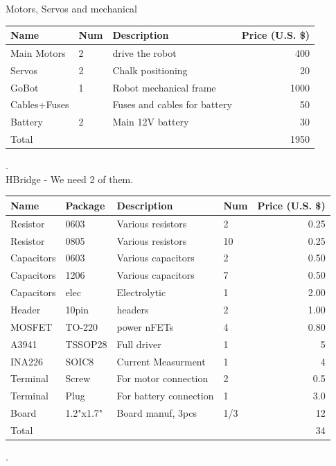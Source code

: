 \documentclass[12pt]{article}
\begin{document}
Motors, Servos and mechanical\\
\begin{tabular}{| l || l | l |r | }
  \hline                       
    Name &Num &Description & Price (U.S. \$) \\ \hline
     Main Motors&2 & drive the robot  & 400 \\
     Servos&2&Chalk positioning & 20 \\
     GoBot&1&Robot mechanical frame& 1000\\ 
     Cables+Fuses&&Fuses and cables for battery&50 \\
     Battery&2&Main 12V battery& 30\\ \hline
     Total  &&&1950\\
   \hline  
   \end{tabular}.\\
  
  HBridge - We need 2 of them.\\
\begin{tabular}{| l | l||l|l | r | }
  \hline                       
    Name & Package & Description & Num &Price (U.S. \$) \\ \hline
    Resistor& 0603&Various resistors&2&0.25 \\
    Resistor& 0805&Various resistors&10&0.25\\
    Capacitors&0603&Various capacitors&2&0.50\\
    Capacitors&1206&Various capacitors&7&0.50\\
    Capacitors&elec&Electrolytic&1&2.00\\
    Header&10pin&headers&2&1.00\\
    MOSFET&TO-220&power nFETs&4&0.80\\
    A3941&TSSOP28&Full driver&1&5\\
    INA226&SOIC8&Current Measurment&1&4\\
    Terminal&Screw&For motor connection&2&0.5\\
    Terminal&Plug&For battery connection&1&3.0\\ 
    Board&1.2"x1.7"&Board manuf, 3pcs&1/3&12\\ \hline
     Total&&&&34\\
   \hline  
   \end{tabular}.\\
 
\end{document}
